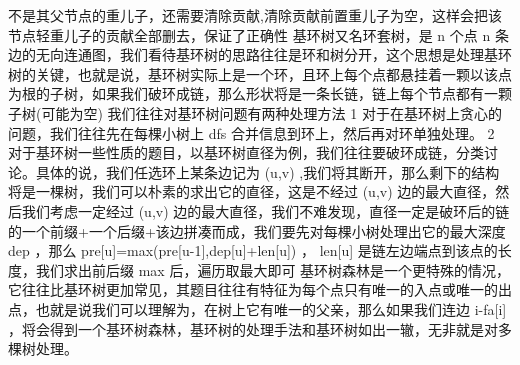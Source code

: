 {}\markdownRendererDollarSign{}不是其父节点的重儿子，还需要清除贡献,清除贡献前置重儿子为空，这样会把该节点轻重儿子的贡献全部删去，保证了正确性\markdownRendererInterblockSeparator
{}\markdownRendererInterblockSeparator
{}
\markdownRendererSectionEnd \markdownRendererSectionBegin
{}\markdownRendererInterblockSeparator
{}基环树又名环套树，是\markdownRendererDollarSign{} n\markdownRendererSoftLineBreak
{}\markdownRendererDollarSign{}个点\markdownRendererDollarSign{} n\markdownRendererSoftLineBreak
{}\markdownRendererDollarSign{}条边的无向连通图，我们看待基环树的思路往往是环和树分开，这个思想是处理基环树的关键，也就是说，基环树实际上是一个环，且环上每个点都悬挂着一颗以该点为根的子树，如果我们破环成链，那么形状将是一条长链，链上每个节点都有一颗子树(可能为空)\markdownRendererParagraphSeparator
{}我们往往对基环树问题有两种处理方法\markdownRendererParagraphSeparator
{}\markdownRendererDollarSign{} 1 \markdownRendererDollarSign{} 对于在基环树上贪心的问题，我们往往先在每棵小树上\markdownRendererDollarSign{} dfs \markdownRendererDollarSign{}合并信息到环上，然后再对环单独处理。\markdownRendererParagraphSeparator
{}\markdownRendererDollarSign{} 2 \markdownRendererDollarSign{}对于基环树一些性质的题目，以基环树直径为例，我们往往要破环成链，分类讨论。具体的说，我们任选环上某条边记为\markdownRendererDollarSign{} (u,v) \markdownRendererDollarSign{},我们将其断开，那么剩下的结构将是一棵树，我们可以朴素的求出它的直径，这是不经过\markdownRendererDollarSign{} (u,v) \markdownRendererDollarSign{}边的最大直径，然后我们考虑一定经过\markdownRendererDollarSign{} (u,v) \markdownRendererDollarSign{}边的最大直径，我们不难发现，直径一定是破环后的链的一个前缀+一个后缀+该边拼凑而成，我们要先对每棵小树处理出它的最大深度\markdownRendererDollarSign{} dep \markdownRendererDollarSign{}，那么\markdownRendererDollarSign{} pre[u]=max(pre[u-1],dep[u]+len[u]) \markdownRendererDollarSign{}，\markdownRendererDollarSign{} len[u]\markdownRendererSoftLineBreak
{}\markdownRendererDollarSign{}是链左边端点到该点的长度，我们求出前后缀\markdownRendererDollarSign{} max \markdownRendererDollarSign{}后，遍历取最大即可\markdownRendererInterblockSeparator
{}\markdownRendererSectionBegin
{}\markdownRendererInterblockSeparator
{}\markdownRendererInterblockSeparator
{}基环树森林是一个更特殊的情况，它往往比基环树更加常见，其题目往往有特征为每个点只有唯一的入点或唯一的出点，也就是说我们可以理解为，在树上它有唯一的父亲，那么如果我们连边\markdownRendererDollarSign{} i-fa[i] \markdownRendererDollarSign{}，将会得到一个基环树森林，基环树的处理手法和基环树如出一辙，无非就是对多棵树处理。\markdownRendererParagraphSeparator
